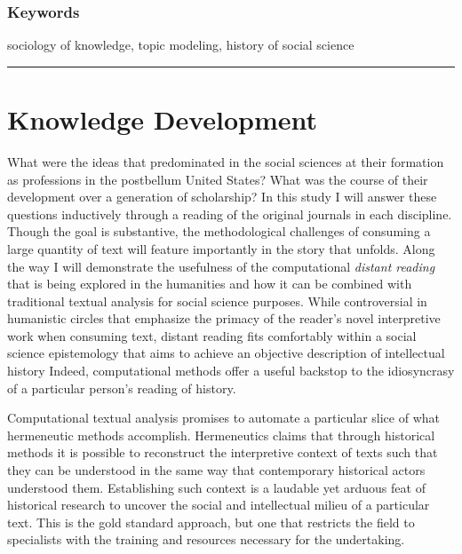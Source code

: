 \documentclass[]{book}
\theoremstyle{definition}
\theoremstyle{definition}
\theoremstyle{definition}
\theoremstyle{remark}
\begin{document}
\hypertarget{keywords-3}{%
\subsubsection*{Keywords}\label{keywords-3}}


sociology of knowledge, topic modeling, history of social
science

\begin{center}\rule{0.5\linewidth}{\linethickness}\end{center}

\hypertarget{kd}{%
\section{Knowledge Development}\label{kd}}

What were the ideas that predominated in the social sciences at their
formation as professions in the postbellum United States? What was the
course of their development over a generation of scholarship? In this
study I will answer these questions inductively through a reading of the
original journals in each discipline. Though the goal is substantive,
the methodological challenges of consuming a large quantity of text will
feature importantly in the story that unfolds. Along the way I will
demonstrate the usefulness of the computational \emph{distant reading}
that is being explored in the humanities and how it can be combined with
traditional textual analysis for social science purposes. While
controversial in humanistic circles that emphasize the primacy of the
reader's novel interpretive work when consuming text, distant reading
fits comfortably within a social science epistemology that aims to
achieve an objective description of intellectual history Indeed,
computational methods offer a useful backstop to the idiosyncrasy of a
particular person's reading of history.

Computational textual analysis promises to automate a particular slice
of what hermeneutic methods accomplish. Hermeneutics claims that through
historical methods it is possible to reconstruct the interpretive
context of texts such that they can be understood in the same way that
contemporary historical actors understood them. Establishing such
context is a laudable yet arduous feat of historical research to uncover
the social and intellectual milieu of a particular text. This is the
gold standard approach, but one that restricts the field to specialists
with the training and resources necessary for the undertaking.
\end{document}
